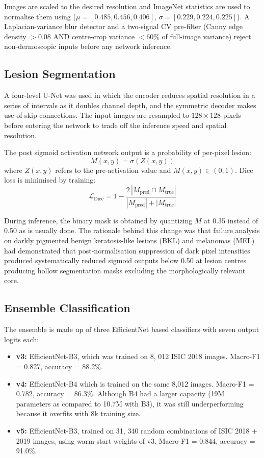 \documentclass[conference]{IEEEtran}
\begin{document}
Images are scaled to the desired resolution and ImageNet statistics are used to normalise them using ($\mu{=}[0.485, 0.456, 0.406]$, $\sigma{=}[0.229, 0.224, 0.225]$). A Laplacian-variance blur detector and a two-signal CV pre-filter (Canny edge density $>0.08$ AND centre-crop variance $<60\%$ of full-image variance) reject non-dermoscopic inputs before any network inference.

\subsection{Lesion Segmentation}

A four-level U-Net was used in which the encoder reduces spatial resolution in a series of intervals as it doubles channel depth, and the symmetric decoder makes use of skip connections. The input images are resampled to $128 \times 128$ pixels before entering the network to trade off the inference speed and spatial resolution.

The post sigmoid activation network output is a probability of per-pixel lesion:
\begin{equation}
M(x,y) = \sigma\!\left(Z(x,y)\right)
\end{equation}
where $Z(x,y)$ refers to the pre-activation value and $M(x,y) \in (0,1)$. Dice loss is minimised by training:
\begin{equation}
\mathcal{L}_{\text{Dice}} = 1 - \frac{2\,|M_{\text{pred}} \cap M_{\text{true}}|}{|M_{\text{pred}}| + |M_{\text{true}}|}
\end{equation}

During inference, the binary mask is obtained by quantizing $M$ at 0.35 instead of 0.50 as is usually done. The rationale behind this change was that failure analysis on darkly pigmented benign keratosis-like lesions (BKL) and melanomas (MEL) had demonstrated that post-normalisation suppression of dark pixel intensities produced systematically reduced sigmoid outputs below 0.50 at lesion centres producing hollow segmentation masks excluding the morphologically relevant core.


\subsection{Ensemble Classification}

The ensemble is made up of three EfficientNet based classifiers with seven output logits each:

\begin{itemize}
\item \textbf{v3:} EfficientNet-B3, which was trained on 8, 012 ISIC 2018 images. Macro-F1 = 0.827, accuracy = 88.2\%.
\item \textbf{v4:} EfficientNet-B4 which is trained on the same 8,012 images. Macro-F1 = 0.782, accuracy = 86.3\%. Although B4 had a larger capacity (19M parameters as compared to 10.7M with B3), it was still underperforming because it overfits with 8k training size.
\item \textbf{v5:} EfficientNet-B3, trained on 31, 340 random combinations of ISIC 2018 + 2019 images, using warm-start weights of v3. Macro-F1 = 0.844, accuracy = 91.0\%.
\end{itemize}
\end{document}
